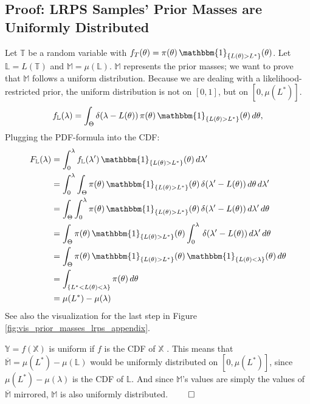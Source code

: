 \documentclass[12pt, a4paper]{report}
\begin{document}
\subsection*{Proof: LRPS Samples' Prior Masses are Uniformly Distributed}
Let $\mathbb{T}$ be a random variable with $f_T(\theta) = \pi(\theta) \, \mathbbm{1}_{\{L(\theta)>L^*\}}(\theta)$.
Let $\mathbb{L} = L(\mathbb{T})$ and $\mathbb{M} = \mu(\mathbb{L})$.
$\mathbb{M}$ represents the prior masses; we want to prove that $\mathbb{M}$ follows a uniform distribution.
Because we are dealing with a likelihood-restricted prior, the uniform distribution is not on $[0,1]$, but on $[0, \mu(L^*)]$.
\begin{equation*}
    f_\mathbb{L}(\lambda) = \int_\Theta \delta(\lambda - L(\theta)) \, \pi(\theta) \, \mathbbm{1}_{\{L(\theta)>L^*\}}(\theta) \, d\theta,
\end{equation*}
Plugging the PDF-formula into the CDF:
\begin{align}
    F_\mathbb{L}(\lambda) &= \int_0^\lambda f_\mathbb{L}(\lambda') \, \mathbbm{1}_{\{L(\theta)>L^*\}}(\theta) \, d\lambda' \nonumber\\
    &= \int_0^\lambda \int_\Theta \pi(\theta) \, \mathbbm{1}_{\{L(\theta)>L^*\}}(\theta) \, \delta(\lambda' - L(\theta)) \, d\theta \, d\lambda' \nonumber\\
    &= \int_\Theta \int_0^\lambda \pi(\theta) \, \mathbbm{1}_{\{L(\theta)>L^*\}}(\theta) \, \delta(\lambda' - L(\theta)) \, d\lambda'\, d\theta \nonumber\\
    &= \int_\Theta \pi(\theta) \, \mathbbm{1}_{\{L(\theta)>L^*\}}(\theta) \int_0^\lambda \, \delta(\lambda' - L(\theta)) \, d\lambda' \, d\theta \nonumber\\
    &= \int_\Theta \pi(\theta) \, \mathbbm{1}_{\{L(\theta)>L^*\}}(\theta) \, \mathbbm{1}_{\{L(\theta) < \lambda\}}(\theta) \, d\theta \nonumber\\
    &= \int_{\{L^* < L(\theta) < \lambda\}} \pi(\theta)\, d\theta \label{eq:prior_mass_integral_appendix}\\
    &= \mu(L^*) - \mu(\lambda) \nonumber
\end{align}
See also the visualization for the last step in Figure \ref{fig:vis_prior_masses_lrps_appendix}.

$\mathbb{Y} = f(\mathbb{X})$ is uniform if $f$ is the CDF of $\mathbb{X}$ \cite[54]{casellaberger}.
This means that $\overline{\mathbb{M}} = \mu(L^*) - \mu(\mathbb{L})$ would be uniformly distributed on $[0,\mu(L^*)]$, since $\mu(L^*) - \mu(\lambda)$ is the CDF of $\mathbb{L}$.
And since $\mathbb{M}$'s values are simply the values of $\overline{\mathbb{M}}$ mirrored, $\mathbb{M}$ is also uniformly distributed.
\hfill $\qed$
\end{document}
